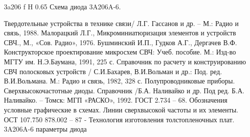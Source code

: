 \documentclass{bmstu}
\begin{document}
	{3a206}
	{f} %
	{H} %
	{0.65\textwidth} %
	{Схема диода 3A206A-6.} %
	
	\begin{thebibliography}{}
		 Твердотельные устройства в технике связи/ Л.Г. Гассанов и др. – М.: Радио и связь, 1988.
		 Малорацкий Л.Г., Микроминиатюризация элементов и устройств СВЧ., М., «Сов. Радио», 1976.
		 Бушминский И.П., Гудков А.Г., Дергачев В.Ф. Конструкторское проектирование микросхем СВЧ: Учеб. пособие. М.: Изд-во МГТУ им. Н.Э.Баумана, 1991, 225 с.
		 Справочник по расчету и конструированию СВЧ полосковых устройств / С.И.Бахарев, В.И.Вольман и др.: Под. ред. В.И.Вольмана. М.: Радио и связь, 1982, 328 с.
		 Полупроводниковые приборы. Сверхвысокочастотные диоды. Справочник /Б.А. Наливайко и др. Под ред. Б.А. Наливайко. – Томск: МГП «РАСКО», 1992.
		 ГОСТ 2.734 – 68. Обозначения условные графические в схемах. Линии сверхвысокой частоты и их элементы.
		 ОСТ 107.750 878.002 – 87 - Технология изготовления толстопленочных плат.
		 3A206A-6 параметры диода
	\end{thebibliography}
	
	
\end{document}
